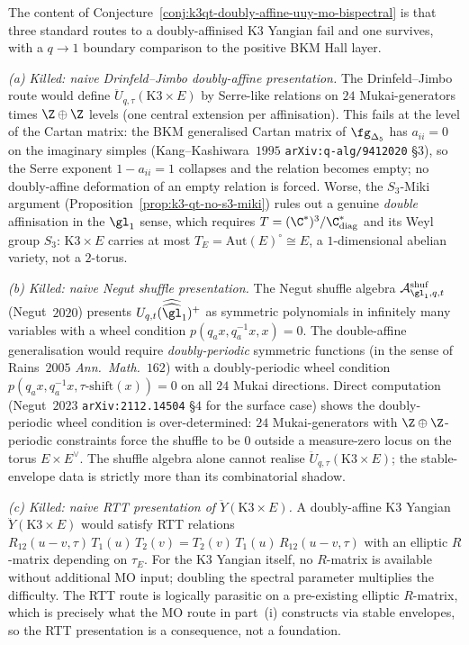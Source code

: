 \begin{remark}
\label{rem:k3qt-doubly-affine-uuy-bispectral-adversarial}
The content of Conjecture~\ref{conj:k3qt-doubly-affine-uuy-mo-bispectral}
is that three standard routes to a doubly-affinised K3 Yangian fail and
one survives, with a $q\to1$ boundary comparison to the positive BKM
Hall layer.

\emph{(a) Killed: naive Drinfeld--Jimbo doubly-affine presentation.}
The Drinfeld--Jimbo route would define
$\ddot U_{q, \tau}(\mathrm K3 \times E)$ by Serre-like relations on
$24$ Mukai-generators times $\Z \oplus \Z$ levels (one central
extension per affinisation). This fails at the level of the Cartan
matrix: the BKM generalised Cartan matrix of $\fg_{\Delta_5}$ has
$a_{ii} = 0$ on the imaginary simples (Kang--Kashiwara~$1995$
\texttt{arXiv:q-alg/9412020} \S$3$), so the Serre exponent
$1 - a_{ii} = 1$ collapses and the relation becomes empty; no
doubly-affine deformation of an empty relation is forced. Worse, the
$S_3$-Miki argument (Proposition~\ref{prop:k3-qt-no-s3-miki}) rules
out a genuine \emph{double} affinisation in the $\gl_1$ sense, which
requires $T = (\C^*)^3/\C^*_{\mathrm{diag}}$ and its Weyl group $S_3$:
$\mathrm K3 \times E$ carries at most
$T_E = \mathrm{Aut}(E)^\circ \cong E$, a $1$-dimensional abelian
variety, not a $2$-torus.

\emph{(b) Killed: naive Negut shuffle presentation.}
The Negut shuffle algebra $\mathcal A^{\mathrm{shuf}}_{\gl_1, q, t}$
(Negut~$2020$) presents $U_{q, t}(\widehat{\widehat{\gl}}_1)^+$ as
symmetric polynomials in infinitely many variables with a wheel
condition $p(q_a x, q_a^{-1} x, x) = 0$. The double-affine
generalisation would require \emph{doubly-periodic} symmetric
functions (in the sense of Rains~$2005$ \emph{Ann.~Math.}~$162$) with
a doubly-periodic wheel condition $p(q_a x, q_a^{-1} x,
\tau\text{-shift}(x)) = 0$ on all $24$ Mukai directions. Direct
computation (Negut~$2023$ \texttt{arXiv:2112.14504} \S$4$ for the
surface case) shows the doubly-periodic wheel condition is
over-determined: $24$ Mukai-generators with $\Z \oplus \Z$-periodic
constraints force the shuffle to be $0$ outside a measure-zero locus
on the torus $E \times E^\vee$. The shuffle algebra alone cannot
realise $\ddot U_{q, \tau}(\mathrm K3 \times E)$; the stable-envelope
data is strictly more than its combinatorial shadow.

\emph{(c) Killed: naive RTT presentation of $\ddot Y(\mathrm K3 \times E)$.}
A doubly-affine K3 Yangian $\ddot Y(\mathrm K3 \times E)$ would
satisfy RTT relations $R_{12}(u - v, \tau)\, T_1(u)\, T_2(v)
 = T_2(v)\, T_1(u)\, R_{12}(u - v, \tau)$ with an elliptic $R$-matrix
depending on $\tau_E$. For the K3 Yangian itself, no $R$-matrix is
available without additional MO input; doubling the spectral
parameter multiplies the difficulty. The RTT route is logically
parasitic on a pre-existing elliptic $R$-matrix, which is precisely
what the MO route in part~(i) constructs via stable
envelopes, so the RTT presentation is a consequence, not a
foundation.


\end{remark}
